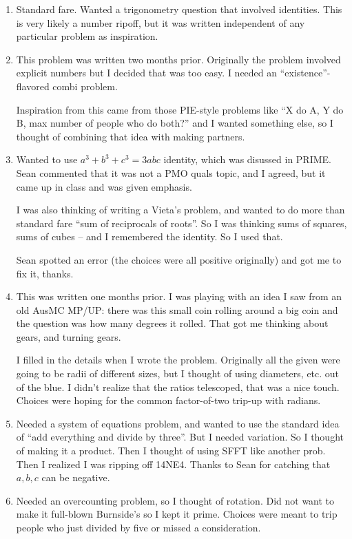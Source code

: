 \documentclass[10pt,paper=letter]{scrartcl}
\begin{document}
\begin{enumerate}
  \item Standard fare. Wanted a trigonometry question that involved identities. This is very likely a number ripoff, but it was written independent of any particular problem as inspiration. 

  \item This problem was written two months prior. Originally the problem involved explicit numbers but I decided that was too easy. I needed an ``existence''-flavored combi problem.

  Inspiration from this came from those PIE-style problems like ``X do A, Y do B, max number of people who do both?'' and I wanted something else, so I thought of combining that idea with making partners.

  \item Wanted to use $a^3 + b^3 + c^3 = 3abc$ identity, which was disussed in PRIME. Sean commented that it was not a PMO quals topic, and I agreed, but it came up in class and was given emphasis.

  I was also thinking of writing a Vieta's problem, and wanted to do more than standard fare ``sum of reciprocals of roots''. So I was thinking sums of squares, sums of cubes -- and I remembered the identity. So I used that.

  Sean spotted an error (the choices were all positive originally) and got me to fix it, thanks.

  \item This was written one months prior. I was playing with an idea I saw from an old AusMC MP/UP: there was this small coin rolling around a big coin and the question was how many degrees it rolled. That got me thinking about gears, and turning gears.

  I filled in the details when I wrote the problem. Originally all the given were going to be radii of different sizes, but I thought of using diameters, etc. out of the blue. I didn't realize that the ratios telescoped, that was a nice touch. Choices were hoping for the common factor-of-two trip-up with radians.

  \item Needed a system of equations problem, and wanted to use the standard idea of ``add everything and divide by three''. But I needed variation. So I thought of making it a product. Then I thought of using SFFT like another prob. Then I realized I was ripping off 14NE4. Thanks to Sean for catching that $a, b, c$ can be negative.

  \item Needed an overcounting problem, so I thought of rotation. Did not want to make it full-blown Burnside's so I kept it prime. Choices were meant to trip people who just divided by five or missed a consideration.


\end{enumerate}
\end{document}
